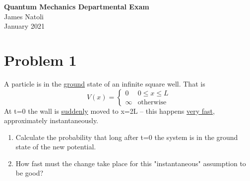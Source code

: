 \documentclass{article}
\begin{document}
\thispagestyle{empty}
\begin{center}\Large \textbf{Quantum Mechanics Departmental Exam} \\
\normalsize James Natoli \\  January 2021
\end{center}

\section*{Problem 1} 
A particle is in the \underline{ground} state of an infinite square well. That is \\
\[ V(x) = \begin{cases} 
      0 & 0\leq x\leq L \\
      \infty & \text{otherwise}
   \end{cases}
\]
At t=0 the wall is \underline{suddenly} moved to x=2L -- this happens \underline{very fast}, approximately instantaneously.
\begin{enumerate}[label=\alph*)]
	\item Calculate the probability that long after t=0 the system is in the ground state of the new potential.
	\item How fast must the change take place for this "instantaneous" assumption to be good?
\end{enumerate}
\end{document}
